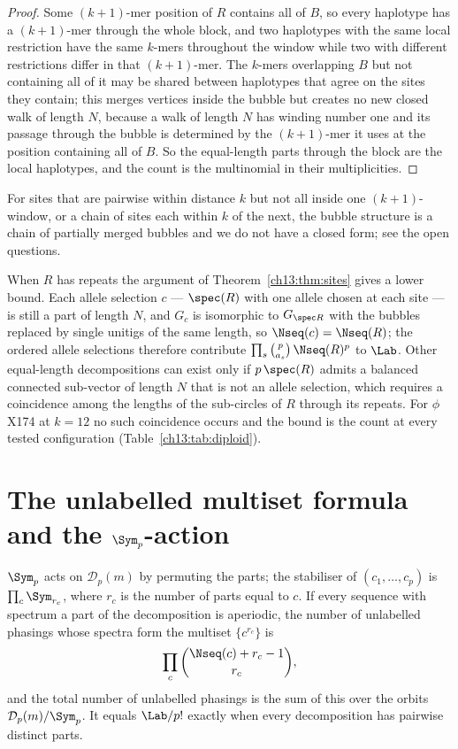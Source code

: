 \begin{proof}
Some $(k{+}1)$-mer position of $R$ contains all of $B$, so every haplotype has a
$(k{+}1)$-mer through the whole block, and two haplotypes with the same local restriction have
the same $k$-mers throughout the window while two with different restrictions differ in that
$(k{+}1)$-mer. The $k$-mers overlapping $B$ but not containing all of it may be shared between
haplotypes that agree on the sites they contain; this merges vertices inside the bubble but
creates no new closed walk of length $N$, because a walk of length $N$ has winding number one
and its passage through the bubble is determined by the $(k{+}1)$-mer it uses at the position
containing all of $B$. So the equal-length parts through the block are the local haplotypes,
and the count is the multinomial in their multiplicities.
\end{proof}

For sites that are pairwise within distance $k$ but not all inside one $(k{+}1)$-window, or a
chain of sites each within $k$ of the next, the bubble structure is a chain of partially merged
bubbles and we do not have a closed form; see the open questions.

\begin{remark}\label{ch13:rem:repeats}
When $R$ has repeats the argument of Theorem~\ref{ch13:thm:sites} gives a lower bound. Each allele
selection $c$ --- $\spec(R)$ with one allele chosen at each site --- is still a part of length
$N$, and $G_c$ is isomorphic to $G_{\spec R}$ with the bubbles replaced by single unitigs of
the same length, so $\Nseq(c)=\Nseq(R)$; the ordered allele selections therefore contribute
$\prod_s\binom{p}{a_s}\,\Nseq(R)^p$ to $\Lab$. Other equal-length decompositions can exist only
if $p\,\spec(R)$ admits a balanced connected sub-vector of length $N$ that is not an allele
selection, which requires a coincidence among the lengths of the sub-circles of $R$ through
its repeats. For $\phi$X174 at $k=12$ no such coincidence occurs and the bound is the count at
every tested configuration (Table~\ref{ch13:tab:diploid}).
\end{remark}

\section{The unlabelled multiset formula and the
\texorpdfstring{$\Sym_p$}{Sp}-action}\label{ch13:sec:unlabelled}

\begin{proposition}\label{ch13:prop:multiset}
$\Sym_p$ acts on $\mathcal D_p(m)$ by permuting the parts; the stabiliser of
$(c_1,\dots,c_p)$ is $\prod_c\Sym_{r_c}$, where $r_c$ is the number of parts equal to $c$.
If every sequence with spectrum a part of the decomposition is aperiodic, the number of
unlabelled phasings whose spectra form the multiset $\{c^{r_c}\}$ is
\[
  \prod_{c}\binom{\Nseq(c)+r_c-1}{r_c},
\]
and the total number of unlabelled phasings is the sum of this over the orbits
$\mathcal D_p(m)/\Sym_p$. It equals $\Lab/p!$ exactly when every decomposition has pairwise
distinct parts.
\end{proposition}

